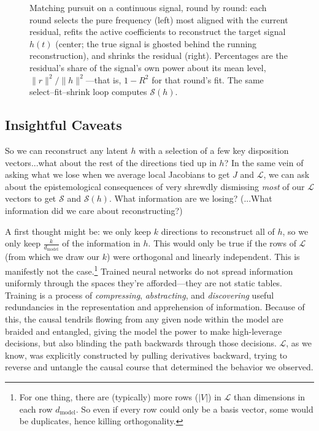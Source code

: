 \documentclass{article}
\newcommand{\jlens}{\mathscr{L}}
\newcommand{\jspace}{\mathscr{S}}
\newcommand{\dmodel}{d_{\text{model}}}
\begin{document}
\begin{figure}[htbp]
\caption{Matching pursuit on a continuous signal, round by round: each round selects the pure frequency (left) most aligned with the current residual, refits the active coefficients to reconstruct the target signal $h(t)$ (center; the true signal is ghosted behind the running reconstruction), and shrinks the residual (right). Percentages are the residual's share of the signal's own power about its mean level, $\lVert r\rVert^2/\lVert h\rVert^2$---that is, $1-R^2$ for that round's fit. The same select--fit--shrink loop computes $\jspace(h)$.}
\label{fig:jspace-freq}
\end{figure}




\subsection{Insightful Caveats}
So we can reconstruct any latent \(h\) with a selection of a few key disposition vectors...what about the rest of the directions tied up in \(h\)? In the same vein of asking what we lose when we average local Jacobians to get \(J\) and \(\jlens\), we can ask about the epistemological consequences of very shrewdly dismissing \textit{most} of our \(\jlens\) vectors to get \(\jspace\) and \(\jspace(h)\). What information are we losing? (...What information did we care about reconstructing?) 

A first thought might be: we only keep \(k\) directions to reconstruct all of \(h\), so we only keep \(\frac{k}{\dmodel}\) of the information in \(h\). This would only be true if the rows of \(\jlens\) (from which we draw our \(k\)) were orthogonal and linearly independent. This is manifestly not the case.\footnote{For one thing, there are (typically) more rows (\(|V|\)) in \(\jlens\) than dimensions in each row \(\dmodel\). So even if every row could only be a basis vector, some would be duplicates, hence killing orthogonality.} Trained neural networks do not spread information uniformly through the spaces they're afforded---they are not static tables. Training is a process of \textit{compressing}, \textit{abstracting}, and \textit{discovering} useful redundancies in the representation and apprehension of information. Because of this, the causal tendrils flowing from any given node within the model are braided and entangled, giving the model the power to make high-leverage decisions, but also blinding the path backwards through those decisions. \(\jlens\), as we know, was explicitly constructed by pulling derivatives backward, trying to reverse and untangle the causal course that determined the behavior we observed.
\end{document}
